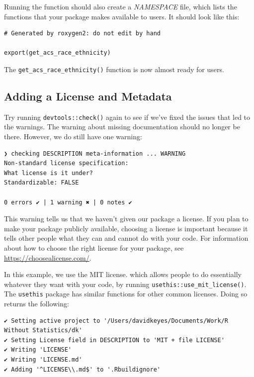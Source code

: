 \documentclass[
]{book}
\begin{document}
Running the function should also create a \emph{NAMESPACE} file, which lists the functions that your package makes available to users. It should look like this:

\begin{verbatim}
# Generated by roxygen2: do not edit by hand

export(get_acs_race_ethnicity)
\end{verbatim}

The \texttt{get\_acs\_race\_ethnicity()} function is now almost ready for users.

\hypertarget{adding-a-license-and-metadata}{%
\subsection*{Adding a License and Metadata}\label{adding-a-license-and-metadata}}

Try running \texttt{devtools::check()} again to see if we've fixed the issues that led to the warnings. The warning about missing documentation should no longer be there. However, we do still have one warning:

\begin{verbatim}
❯ checking DESCRIPTION meta-information ... WARNING
Non-standard license specification:
What license is it under?
Standardizable: FALSE

0 errors ✔ | 1 warning ✖ | 0 notes ✔
\end{verbatim}

This warning tells us that we haven't given our package a license. If you plan to make your package publicly available, choosing a license is important because it tells other people what they can and cannot do with your code. For information about how to choose the right license for your package, see \url{https://choosealicense.com/}.

In this example, we use the MIT license. which allows people to do essentially whatever they want with your code, by running \texttt{usethis::use\_mit\_license()}. The \texttt{usethis} package has similar functions for other common licenses. Doing so returns the following:

\begin{verbatim}
✔ Setting active project to '/Users/davidkeyes/Documents/Work/R Without Statistics/dk'
✔ Setting License field in DESCRIPTION to 'MIT + file LICENSE'
✔ Writing 'LICENSE'
✔ Writing 'LICENSE.md'
✔ Adding '^LICENSE\\.md$' to '.Rbuildignore'
\end{verbatim}
\end{document}
